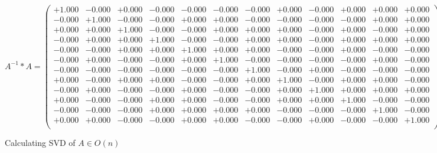 \documentclass[9pt]{article}
\theoremstyle{plain}
\theoremstyle{definition}
\theoremstyle{remark}
\numberwithin{equation}{section}
\begin{document}
$A^{-1} *A = \left(
\begin{array}{
cccccccccccc}
+1.000 & -0.000 & +0.000 & -0.000 & -0.000 & -0.000 & -0.000 & +0.000 & -0.000 & +0.000 & +0.000 & +0.000 \\
-0.000 & +1.000 & -0.000 & -0.000 & +0.000 & +0.000 & -0.000 & -0.000 & -0.000 & -0.000 & +0.000 & +0.000 \\
+0.000 & +0.000 & +1.000 & -0.000 & -0.000 & +0.000 & +0.000 & +0.000 & -0.000 & +0.000 & -0.000 & +0.000 \\
-0.000 & +0.000 & +0.000 & +1.000 & -0.000 & -0.000 & +0.000 & +0.000 & -0.000 & +0.000 & +0.000 & +0.000 \\
-0.000 & -0.000 & +0.000 & +0.000 & +1.000 & +0.000 & +0.000 & -0.000 & -0.000 & +0.000 & -0.000 & -0.000 \\
-0.000 & +0.000 & -0.000 & -0.000 & +0.000 & +1.000 & -0.000 & -0.000 & -0.000 & -0.000 & +0.000 & -0.000 \\
-0.000 & -0.000 & -0.000 & -0.000 & -0.000 & -0.000 & +1.000 & -0.000 & +0.000 & -0.000 & -0.000 & -0.000 \\
+0.000 & -0.000 & +0.000 & +0.000 & -0.000 & -0.000 & +0.000 & +1.000 & -0.000 & +0.000 & +0.000 & -0.000 \\
-0.000 & +0.000 & -0.000 & -0.000 & +0.000 & -0.000 & -0.000 & +0.000 & +1.000 & +0.000 & +0.000 & +0.000 \\
+0.000 & -0.000 & -0.000 & +0.000 & +0.000 & -0.000 & -0.000 & +0.000 & +0.000 & +1.000 & -0.000 & -0.000 \\
-0.000 & -0.000 & -0.000 & +0.000 & +0.000 & +0.000 & +0.000 & -0.000 & -0.000 & -0.000 & +1.000 & -0.000 \\
+0.000 & +0.000 & -0.000 & -0.000 & +0.000 & +0.000 & -0.000 & -0.000 & +0.000 & -0.000 & -0.000 & +1.000 \\
\end{array}
\right)$ \newline 

Calculating SVD of  $A \in O(n)$
\end{document}
